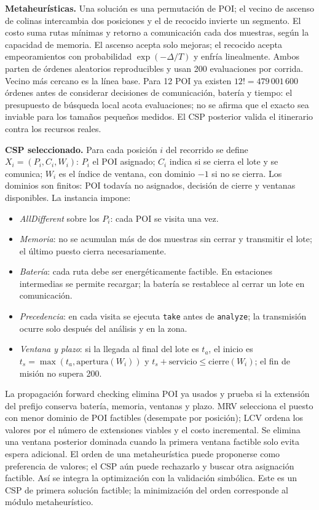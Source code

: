 \documentclass[10pt,spanish]{article}
\begin{document}
\textbf{Metaheurísticas.} Una solución es una permutación de POI; el vecino de ascenso de colinas intercambia dos posiciones y el de recocido invierte un segmento. El costo suma rutas mínimas y retorno a comunicación cada dos muestras, según la capacidad de memoria. El ascenso acepta solo mejoras; el recocido acepta empeoramientos con probabilidad $\exp(-\Delta/T)$ y enfría linealmente. Ambos parten de órdenes aleatorios reproducibles y usan 200 evaluaciones por corrida. Vecino más cercano es la línea base. Para 12 POI ya existen $12!=479\,001\,600$ órdenes antes de considerar decisiones de comunicación, batería y tiempo: el presupuesto de búsqueda local acota evaluaciones; no se afirma que el exacto sea inviable para los tamaños pequeños medidos. El CSP posterior valida el itinerario contra los recursos reales.

\textbf{CSP seleccionado.} Para cada posición $i$ del recorrido se define $X_i=(P_i,C_i,W_i)$: $P_i$ el POI asignado; $C_i$ indica si se cierra el lote y se comunica; $W_i$ es el índice de ventana, con dominio $-1$ si no se cierra. Los dominios son finitos: POI todavía no asignados, decisión de cierre y ventanas disponibles. La instancia impone:
\begin{itemize}
  \item \textit{AllDifferent} sobre los $P_i$: cada POI se visita una vez.
  \item \textit{Memoria}: no se acumulan más de dos muestras sin cerrar y transmitir el lote; el último puesto cierra necesariamente.
  \item \textit{Batería}: cada ruta debe ser energéticamente factible. En estaciones intermedias se permite recargar; la batería se restablece al cerrar un lote en comunicación.
  \item \textit{Precedencia}: en cada visita se ejecuta \texttt{take} antes de \texttt{analyze}; la transmisión ocurre solo después del análisis y en la zona.
  \item \textit{Ventana y plazo}: si la llegada al final del lote es $t_a$, el inicio es $t_s=\max(t_a,\text{apertura}(W_i))$ y $t_s+\text{servicio}\leq\text{cierre}(W_i)$; el fin de misión no supera 200.
\end{itemize}
La propagación forward checking elimina POI ya usados y prueba si la extensión del prefijo conserva batería, memoria, ventanas y plazo. MRV selecciona el puesto con menor dominio de POI factibles (desempate por posición); LCV ordena los valores por el número de extensiones viables y el costo incremental. Se elimina una ventana posterior dominada cuando la primera ventana factible solo evita espera adicional. El orden de una metaheurística puede proponerse como preferencia de valores; el CSP aún puede rechazarlo y buscar otra asignación factible. Así se integra la optimización con la validación simbólica. Este es un CSP de primera solución factible; la minimización del orden corresponde al módulo metaheurístico.
\end{document}
